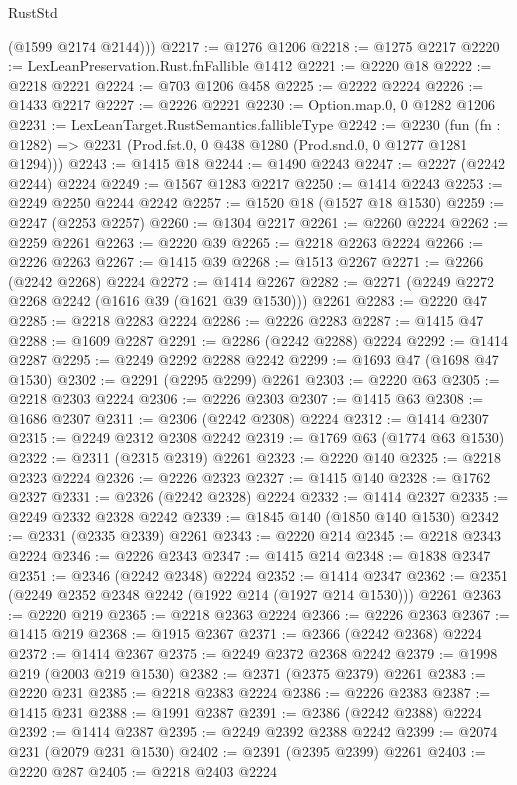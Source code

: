 \begin{lexlean}{RustStd}
\begin{coremodule}
        (@1599 @2174 @2144)))
@2217 := @1276 @1206
@2218 := @1275 @2217
@2220 := LexLeanPreservation.Rust.fnFallible @1412
@2221 := @2220 @18
@2222 := @2218 @2221
@2224 := @703 @1206 @458
@2225 := @2222 @2224
@2226 := @1433 @2217
@2227 := @2226 @2221
@2230 := Option.map.{0, 0} @1282 @1206
@2231 := LexLeanTarget.RustSemantics.fallibleType
@2242 := @2230
    (fun (fn : @1282) => @2231 (Prod.fst.{0, 0} @438 @1280 (Prod.snd.{0, 0} @1277 @1281 @1294)))
@2243 := @1415 @18
@2244 := @1490 @2243
@2247 := @2227 (@2242 @2244) @2224
@2249 := @1567 @1283 @2217
@2250 := @1414 @2243
@2253 := @2249 @2250 @2244 @2242
@2257 := @1520 @18 (@1527 @18 @1530)
@2259 := @2247 (@2253 @2257)
@2260 := @1304 @2217
@2261 := @2260 @2224
@2262 := @2259 @2261
@2263 := @2220 @39
@2265 := @2218 @2263 @2224
@2266 := @2226 @2263
@2267 := @1415 @39
@2268 := @1513 @2267
@2271 := @2266 (@2242 @2268) @2224
@2272 := @1414 @2267
@2282 := @2271 (@2249 @2272 @2268 @2242 (@1616 @39 (@1621 @39 @1530))) @2261
@2283 := @2220 @47
@2285 := @2218 @2283 @2224
@2286 := @2226 @2283
@2287 := @1415 @47
@2288 := @1609 @2287
@2291 := @2286 (@2242 @2288) @2224
@2292 := @1414 @2287
@2295 := @2249 @2292 @2288 @2242
@2299 := @1693 @47 (@1698 @47 @1530)
@2302 := @2291 (@2295 @2299) @2261
@2303 := @2220 @63
@2305 := @2218 @2303 @2224
@2306 := @2226 @2303
@2307 := @1415 @63
@2308 := @1686 @2307
@2311 := @2306 (@2242 @2308) @2224
@2312 := @1414 @2307
@2315 := @2249 @2312 @2308 @2242
@2319 := @1769 @63 (@1774 @63 @1530)
@2322 := @2311 (@2315 @2319) @2261
@2323 := @2220 @140
@2325 := @2218 @2323 @2224
@2326 := @2226 @2323
@2327 := @1415 @140
@2328 := @1762 @2327
@2331 := @2326 (@2242 @2328) @2224
@2332 := @1414 @2327
@2335 := @2249 @2332 @2328 @2242
@2339 := @1845 @140 (@1850 @140 @1530)
@2342 := @2331 (@2335 @2339) @2261
@2343 := @2220 @214
@2345 := @2218 @2343 @2224
@2346 := @2226 @2343
@2347 := @1415 @214
@2348 := @1838 @2347
@2351 := @2346 (@2242 @2348) @2224
@2352 := @1414 @2347
@2362 := @2351 (@2249 @2352 @2348 @2242 (@1922 @214 (@1927 @214 @1530))) @2261
@2363 := @2220 @219
@2365 := @2218 @2363 @2224
@2366 := @2226 @2363
@2367 := @1415 @219
@2368 := @1915 @2367
@2371 := @2366 (@2242 @2368) @2224
@2372 := @1414 @2367
@2375 := @2249 @2372 @2368 @2242
@2379 := @1998 @219 (@2003 @219 @1530)
@2382 := @2371 (@2375 @2379) @2261
@2383 := @2220 @231
@2385 := @2218 @2383 @2224
@2386 := @2226 @2383
@2387 := @1415 @231
@2388 := @1991 @2387
@2391 := @2386 (@2242 @2388) @2224
@2392 := @1414 @2387
@2395 := @2249 @2392 @2388 @2242
@2399 := @2074 @231 (@2079 @231 @1530)
@2402 := @2391 (@2395 @2399) @2261
@2403 := @2220 @287
@2405 := @2218 @2403 @2224

\end{coremodule}
\end{lexlean}
